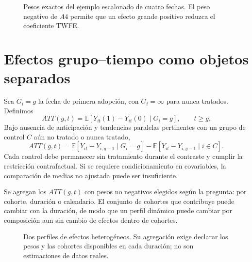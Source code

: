 \documentclass[11pt,a4paper]{article}
\newcommand{\E}{\mathbb E}
\theoremstyle{definition}
\begin{document}
\begin{figure}[htbp]\centering
{}
\caption{Pesos exactos del ejemplo escalonado de cuatro fechas. El peso negativo de $A4$ permite que un efecto grande positivo reduzca el coeficiente TWFE.}\label{fig:panel-16}
\end{figure}
\section{Efectos grupo--tiempo como objetos separados}
Sea $G_i=g$ la fecha de primera adopción, con $G_i=\infty$ para nunca tratados.
Definimos
\[
ATT(g,t)=\E[Y_{it}(1)-Y_{it}(0)\mid G_i=g],\qquad t\ge g.
\]
Bajo ausencia de anticipación y tendencias paralelas pertinentes con un grupo de control $C$ aún no tratado o nunca tratado,
\[
ATT(g,t)=
\E[Y_{it}-Y_{i,g-1}\mid G_i=g]
-\E[Y_{it}-Y_{i,g-1}\mid i\in C].
\]
Cada control debe permanecer sin tratamiento durante el contraste y cumplir la restricción contrafactual. Si se requiere condicionamiento en covariables, la comparación de medias no ajustada puede ser insuficiente.

Se agregan los $ATT(g,t)$ con pesos no negativos elegidos según la pregunta: por cohorte, duración o calendario. El conjunto de cohortes que contribuye puede cambiar con la duración, de modo que un perfil dinámico puede cambiar por composición aun sin cambio de efectos dentro de cohortes.



\begin{figure}[htbp]\centering
{}
\caption{Dos perfiles de efectos heterogéneos. Su agregación exige declarar los pesos y las cohortes disponibles en cada duración; no son estimaciones de datos reales.}\label{fig:panel-17}
\end{figure}
\end{document}
